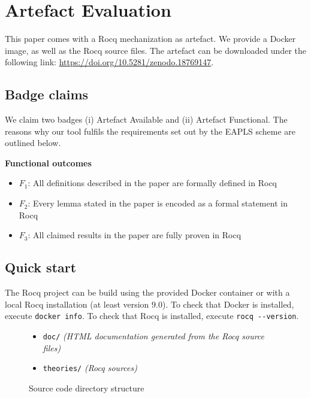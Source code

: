 
\section{Artefact Evaluation}

This paper comes with a Rocq mechanization as artefact.
We provide a Docker image, as well as the Rocq source files.
The artefact can be downloaded under the following link: \url{https://doi.org/10.5281/zenodo.18769147}.

\subsection{Badge claims}
We claim two badges (i) Artefact Available and (ii) Artefact Functional.
The reasons why our tool fulfils the requirements set out by the EAPLS scheme are outlined below.

\vspace{1\baselineskip}
\noindent
\textbf{Functional outcomes}
\begin{itemize}
  \item $F_1$: All definitions described in the paper are formally defined in Rocq
  \item $F_2$: Every lemma stated in the paper is encoded as a formal statement in Rocq
  \item $F_3$: All claimed results in the paper are fully proven in Rocq
\end{itemize}

\subsection{Quick start}
The Rocq project can be build using the provided Docker container or with a local Rocq installation (at least version $9.0$).
To check that Docker is installed, execute \lstinline|docker info|.
To check that Rocq is installed, execute \lstinline|rocq --version|.

\begin{figure}
  \begin{itemize}
    \item \lstinline{doc/} \textit{(HTML documentation generated from the Rocq source files)}
    \item \lstinline{theories/} \textit{(Rocq sources)}
  \end{itemize}

  \caption{Source code directory structure}
  \label{fig:dir-structure}
\end{figure}


